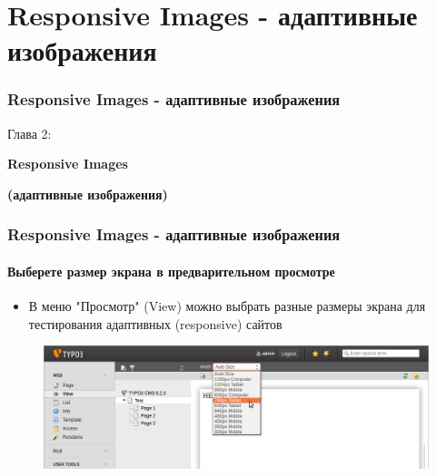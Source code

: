 %

\section{Responsive Images - адаптивные изображения}
\begin{frame}[fragile]
	\frametitle{Responsive Images - адаптивные изображения}

	\begin{center}\huge{Глава 2:}\end{center}
	\begin{center}\huge{\color{typo3darkgrey}\textbf{Responsive Images}}\end{center}
	\begin{center}\huge{\color{typo3darkgrey}\textbf{(адаптивные изображения)}}\end{center}

\end{frame}


\begin{frame}[fragile]
	\frametitle{Responsive Images - адаптивные изображения}
	\framesubtitle{Выберете размер экрана в предварительном просмотре}

	\begin{itemize}
		\item В меню "Просмотр" (View) можно выбрать разные размеры экрана для тестирования адаптивных (responsive) сайтов
	\end{itemize}

	\begin{figure}
		\includegraphics[width=0.95\linewidth]{Images/ResponsiveImages/ScreenSizeInPagePreview.png}
	\end{figure}

\end{frame}

